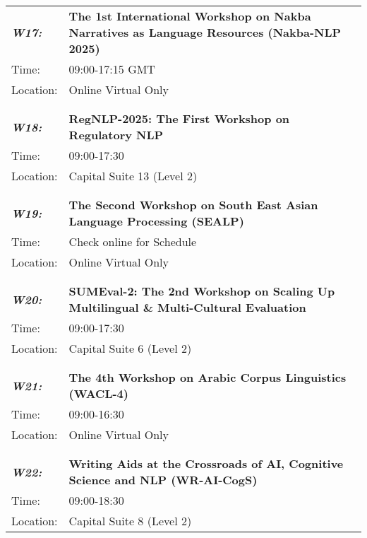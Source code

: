 \begin{longtable}{p{15mm}p{100mm}}
\emph{\textbf{W17:}} & \textbf{The 1st International Workshop on Nakba Narratives as Language Resources (Nakba-NLP 2025)} \\
Time: & 09:00-17:15 GMT \\
Location: & Online Virtual Only \\\\
\hline\\
\emph{\textbf{W18:}} & \textbf{RegNLP-2025: The First Workshop on Regulatory NLP} \\
Time: & 09:00-17:30 \\
Location: & Capital Suite 13 (Level 2) \\\\
\hline\\
\emph{\textbf{W19:}} & \textbf{The Second Workshop on South East Asian Language Processing (SEALP)} \\
Time: & Check online for Schedule \\
Location: & Online Virtual Only \\\\
\hline\\
\emph{\textbf{W20:}} & \textbf{SUMEval-2: The 2nd Workshop on Scaling Up Multilingual \& Multi-Cultural Evaluation} \\
Time: & 09:00-17:30 \\
Location: & Capital Suite 6 (Level 2) \\\\
\hline\\
\emph{\textbf{W21:}} & \textbf{The 4th Workshop on Arabic Corpus Linguistics (WACL-4)} \\
Time: & 09:00-16:30 \\
Location: & Online Virtual Only \\\\
\hline\\
\emph{\textbf{W22:}} & \textbf{Writing Aids at the Crossroads of AI, Cognitive Science and NLP (WR-AI-CogS)} \\
Time: & 09:00-18:30 \\
Location: & Capital Suite 8 (Level 2) \\
\end{longtable}